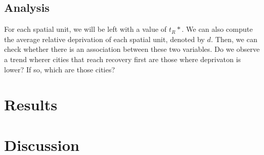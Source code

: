 \documentclass[11pt,letterpaper]{article}
\begin{document}
\subsection{Analysis}

For each spatial unit, we will be left with a value of \(t_R*\). We can
also compute the average relative deprivation of each spatial unit,
denoted by \(d\). Then, we can check whether there is an association
between these two variables. Do we observe a trend wherer cities that
reach recovery first are those where deprivaton is lower? If so, which
are those cities?

\section{Results}

\section{Discussion}




\setlength{\bibsep}{0.00cm plus 0.05cm} %


\end{document}
